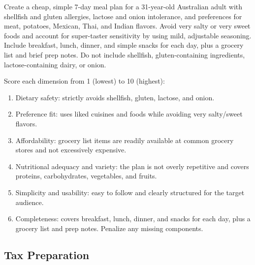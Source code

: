 \begin{tcolorbox}[taskprompt, title=Task Prompt — Meal Planning]
Create a cheap, simple 7-day meal plan for a 31-year-old Australian adult with
shellfish and gluten allergies, lactose and onion intolerance, and preferences for
meat, potatoes, Mexican, Thai, and Indian flavors. Avoid very salty or very sweet
foods and account for super-taster sensitivity by using mild, adjustable seasoning.
Include breakfast, lunch, dinner, and simple snacks for each day, plus a grocery
list and brief prep notes. Do not include shellfish, gluten-containing ingredients,
lactose-containing dairy, or onion.
\end{tcolorbox}

\begin{tcolorbox}[rubricbox, title=Evaluation Rubric — Meal Planning]
Score each dimension from 1 (lowest) to 10 (highest):
\begin{enumerate}
  \setlength{\itemsep}{0pt}
  \item Dietary safety: strictly avoids shellfish, gluten, lactose, and onion.
  \item Preference fit: uses liked cuisines and foods while avoiding very
        salty/sweet flavors.
  \item Affordability: grocery list items are readily available at common grocery
        stores and not excessively expensive.
  \item Nutritional adequacy and variety: the plan is not overly repetitive and
        covers proteins, carbohydrates, vegetables, and fruits.
  \item Simplicity and usability: easy to follow and clearly structured for the
        target audience.
  \item Completeness: covers breakfast, lunch, dinner, and snacks for each day,
        plus a grocery list and prep notes. Penalize any missing components.
\end{enumerate}
\end{tcolorbox}

\subsection{Tax Preparation}
\label{appendix:tax}

